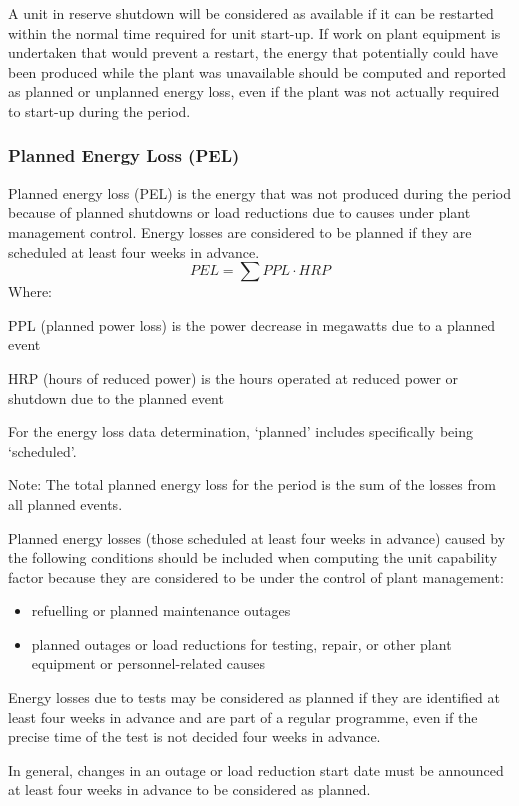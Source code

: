 A unit in reserve shutdown will be considered as available if it can
be restarted within the normal time required for unit start-up. If
work on plant equipment is undertaken that would prevent a restart,
the energy that potentially could have been produced while the plant
was unavailable should be computed and reported as planned or
unplanned energy loss, even if the plant was not actually required to
start-up during the period.

\subsubsection{Planned Energy Loss (PEL)}
Planned energy loss (PEL) is the energy that was not produced during the period because of planned shutdowns or load reductions due to causes under plant management control. Energy losses are considered to be planned if they are scheduled at least four weeks in advance.
$$PEL = \sum{PPL \cdot HRP}$$
Where:

PPL (planned power loss) is the power decrease in megawatts due to a
planned event

HRP (hours of reduced power) is the hours operated at reduced power or
shutdown due to the planned event

For the energy loss data determination, ‘planned’ includes
specifically being ‘scheduled’.

Note:	The total planned energy loss for the period is the sum of the
losses from all planned events.

Planned energy losses (those scheduled at least four weeks in advance)
caused by the following conditions should be included when computing
the unit capability factor because they are considered to be under the
control of plant management:
\begin{itemize}
\item refuelling or planned maintenance outages
\item planned outages or load reductions for testing, repair, or other
  plant equipment or personnel-related causes
\end{itemize}

Energy losses due to tests may be considered as planned if they are
identified at least four weeks in advance and are part of a regular
programme, even if the precise time of the test is not decided four
weeks in advance.

In general, changes in an outage or load reduction start date must be
announced at least four weeks in advance to be considered as planned.

